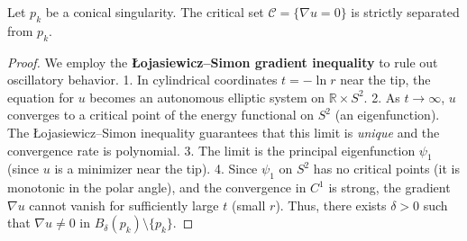 \begin{lemma}
\label{lem:GradientNearTip}
Let $p_k$ be a conical singularity. The critical set $\mathcal{C} = \{\nabla u = 0\}$ is strictly separated from $p_k$.
\end{lemma}
\begin{proof}
We employ the \textbf{\L{}ojasiewicz--Simon gradient inequality} to rule out oscillatory behavior.
1. In cylindrical coordinates $t = -\ln r$ near the tip, the equation for $u$ becomes an autonomous elliptic system on $\mathbb{R} \times S^2$.
2. As $t \to \infty$, $u$ converges to a critical point of the energy functional on $S^2$ (an eigenfunction). The \L{}ojasiewicz--Simon inequality guarantees that this limit is \emph{unique} and the convergence rate is polynomial.
3. The limit is the principal eigenfunction $\psi_1$ (since $u$ is a minimizer near the tip).
4. Since $\psi_1$ on $S^2$ has no critical points (it is monotonic in the polar angle), and the convergence in $C^1$ is strong, the gradient $\nabla u$ cannot vanish for sufficiently large $t$ (small $r$).
Thus, there exists $\delta > 0$ such that $\nabla u \neq 0$ in $B_\delta(p_k) \setminus \{p_k\}$.
\end{proof}

